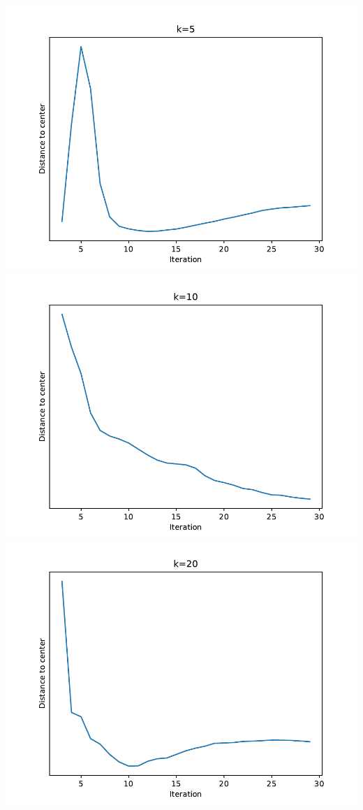 \documentclass{article}
\newcommand{\1}{\mathbf{1}}
\begin{document}
\begin{enumerate}
    \includegraphics[width=4 in]{Figures/error++5.pdf}\\
    \includegraphics[width=4 in]{Figures/error++10.pdf}\\
    \includegraphics[width=4 in]{Figures/error++20.pdf}\\
    

\end{enumerate}
\end{document}
